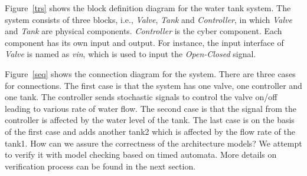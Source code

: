 Figure~\ref{trs} shows the block definition diagram for the water tank system. The system consists of three blocks, i.e., \emph{Valve}, \emph{Tank} and \emph{Controller}, in which \emph{Valve} and \emph{Tank} are physical components. \emph{Controller} is the cyber component. Each component has its own input and output. For instance, the input interface of \emph{Valve} is named as \emph{vin}, which is used to input the \emph{Open-Closed} signal. 

Figure~\ref{seq} shows the connection diagram for the system. There are three cases for connections. The first case is that the system has one valve, one controller and one tank. The controller sends stochastic signals to control the valve on/off leading to various rate of water flow. The second case is that the signal from the controller is affected by the water level of the tank. The last case is on the basis of the first case and adds another tank2 which is affected by the flow rate of the tank1. How can we assure the correctness of the architecture models? We attempt to verify it with model checking based on timed automata. More details on verification process can be found in the next section.